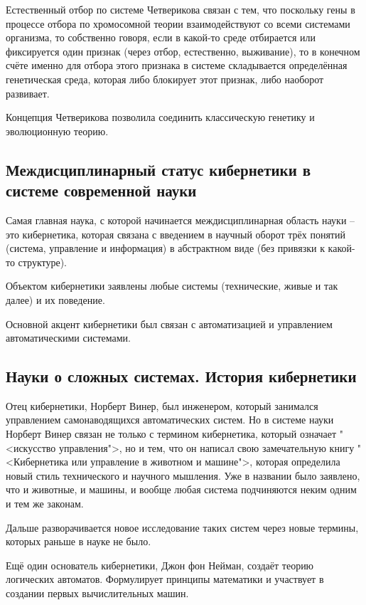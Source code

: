 \documentclass[main.tex]{subfiles}
\begin{document}
Естественный отбор по системе Четверикова связан с тем, что поскольку гены в процессе отбора по хромосомной теории взаимодействуют со всеми системами организма, то собственно говоря, если в какой-то среде отбирается или фиксируется один признак (через отбор, естественно, выживание), то в конечном счёте именно для отбора этого признака в системе складывается определённая генетическая среда, которая либо блокирует этот признак, либо наоборот развивает.

Концепция Четверикова позволила соединить классическую генетику и эволюционную теорию.

\subsection{Междисциплинарный статус кибернетики в системе современной науки}


Самая главная наука, с которой начинается междисциплинарная область науки -- это кибернетика, которая связана с введением в научный оборот трёх понятий (система, управление и информация) в абстрактном виде (без привязки к какой-то структуре).

Объектом кибернетики заявлены любые системы (технические, живые и так далее) и их поведение.

Основной акцент кибернетики был связан с автоматизацией и управлением автоматическими системами.

\subsection{Науки о сложных системах. История кибернетики}


Отец кибернетики, Норберт Винер, был инженером, который занимался управлением самонаводящихся автоматических систем.
Но в системе науки Норберт Винер связан не только с термином кибернетика, который означает "<искусство управления">, но и тем, что он написал свою замечательную книгу "<Кибернетика или управление в животном и машине">, которая определила новый стиль технического и научного мышления.
Уже в названии было заявлено, что и животные, и машины, и вообще любая система подчиняются неким одним и тем же законам.

Дальше разворачивается новое исследование таких систем через новые термины, которых раньше в науке не было.

Ещё один основатель кибернетики, Джон фон Нейман, создаёт теорию логических автоматов.
Формулирует принципы математики и участвует в создании первых вычислительных машин. 
\end{document}
